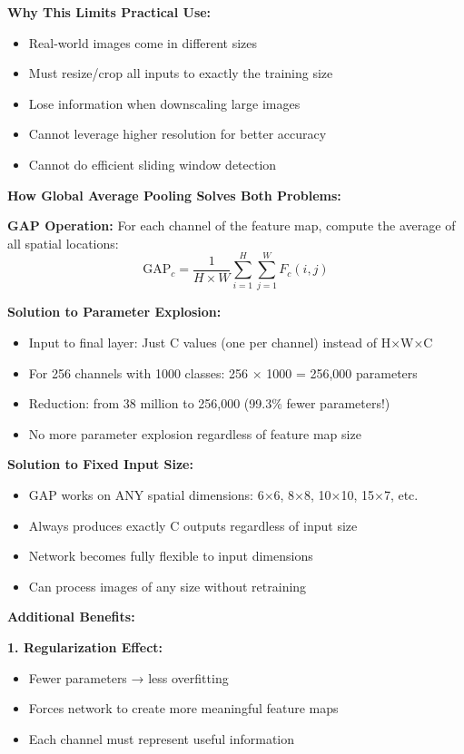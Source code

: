 \documentclass[12pt]{article}
\newcommand{\explanation}[1]{{\color{explanationcolor}#1}}
\begin{document}
\begin{enumerate}[(a)]
{{    \textbf{Why This Limits Practical Use:}
    \begin{itemize}
        \item Real-world images come in different sizes
        \item Must resize/crop all inputs to exactly the training size
        \item Lose information when downscaling large images
        \item Cannot leverage higher resolution for better accuracy
        \item Cannot do efficient sliding window detection
    \end{itemize}
    }
    
    \textbf{How Global Average Pooling Solves Both Problems:}
    
    \explanation{
    \textbf{GAP Operation:}
    For each channel of the feature map, compute the average of all spatial locations:
    \[
    \text{GAP}_c = \frac{1}{H \times W} \sum_{i=1}^{H} \sum_{j=1}^{W} F_c(i,j)
    \]
    
    \textbf{Solution to Parameter Explosion:}
    \begin{itemize}
        \item Input to final layer: Just C values (one per channel) instead of H×W×C
        \item For 256 channels with 1000 classes: 256 × 1000 = 256,000 parameters
        \item Reduction: from 38 million to 256,000 (99.3\% fewer parameters!)
        \item No more parameter explosion regardless of feature map size
    \end{itemize}
    
    \textbf{Solution to Fixed Input Size:}
    \begin{itemize}
        \item GAP works on ANY spatial dimensions: 6×6, 8×8, 10×10, 15×7, etc.
        \item Always produces exactly C outputs regardless of input size
        \item Network becomes fully flexible to input dimensions
        \item Can process images of any size without retraining
    \end{itemize}
    }
    
    \textbf{Additional Benefits:}
    
    \explanation{
    \textbf{1. Regularization Effect:}
    \begin{itemize}
        \item Fewer parameters → less overfitting
        \item Forces network to create more meaningful feature maps
        \item Each channel must represent useful information
    \end{itemize}
    
}}
\end{enumerate}
\end{document}
